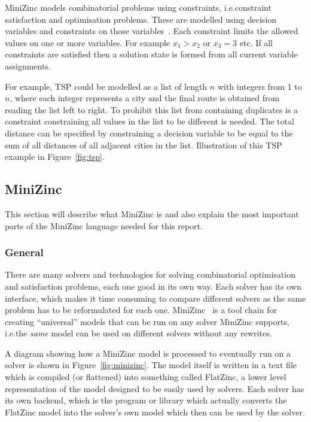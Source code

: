 \documentclass[a4paper,12pt]{article}
\begin{document}
MiniZinc models combinatorial problems using constraints, i.e.\@ constraint satisfaction
and optimisation problems. These are modelled using decision variables and
constraints on those variables~\cite{constraintshandbook}. Each constraint limits the
allowed values on one or more variables.
For example $x_1 > x_2$ or $x_3 = 3$ etc. If all constraints are satisfied then a
solution state is formed from all current variable assignments.

For example, TSP could be modelled as a list of length $n$ with integers from 1 to $n$,
where each integer represents a city and the final route is obtained from reading the list
left to right. To prohibit this list from containing duplicates is a constraint
constraining all values in the list to be different is needed. The total distance can be
specified by constraining a decision variable to be equal to the sum of all distances of
all adjacent cities in the list. Illustration of this TSP example in Figure~\ref{fig:tsp}.

\subsection{MiniZinc}\label{sec:mzn}
This section will describe what MiniZinc is and also explain
the most important parts of the MiniZinc language needed for this report.

\subsubsection{General}
There are many solvers and technologies for solving combinatorial optimisation and
satisfaction problems, each one good in its own way. Each solver
has its own interface, which makes it time consuming to compare different
solvers as the same problem has to be reformulated for each one. MiniZinc~\cite{MiniZinc}
is a tool chain for creating ``universal'' models that can be run on any solver MiniZinc
supports, i.e.\@ the \emph{same} model can be used on different solvers without any
rewrites.

A diagram showing how a MiniZinc model is processed to eventually run on a
solver is shown in Figure~\ref{fig:minizinc}. The model itself is written in a text file
which is compiled (or flattened) into something called FlatZinc, a lower level
representation of the model designed to be easily used by solvers. Each
solver has its own backend, which is the program or library which actually converts the
FlatZinc model into the solver's own model which then can be used by the solver.
\end{document}
